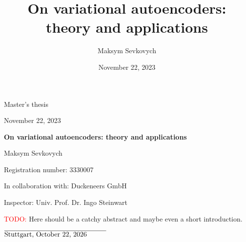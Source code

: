 \documentclass[12pt, a4paper]{scrreprt}
\title{On variational autoencoders: theory and applications}
\date{November 22, 2023}
\author{Maksym Sevkovych}
\theoremstyle{plain}
\theoremstyle{definition}
\theoremstyle{plain}
\begin{document}
\begin{titlepage}
\vspace*{1 cm}
\begin{center}
\LARGE{Master's thesis}

\vspace{0.5 cm}

\large{November 22, 2023}

\vspace{0.5 cm}

\Huge{\textbf{On variational autoencoders: theory and applications}}

\vspace{0.5 cm}

\Large{Maksym Sevkovych}

\Large{Registration number: 3330007}

\Large{In collaboration with: Duckeneers GmbH}
\vspace{1 cm}

\Large{Inspector: Univ. Prof. Dr. Ingo Steinwart}
\vspace{3cm}
\end{center}
\textcolor{red}{TODO:} Here should be a catchy abstract and maybe even a short introduction.
\end{titlepage}
\newpage
\tableofcontents







\vspace{4 cm}

$\overline{\text{Stuttgart, \today} \hspace{1 cm}}$
\end{document}
